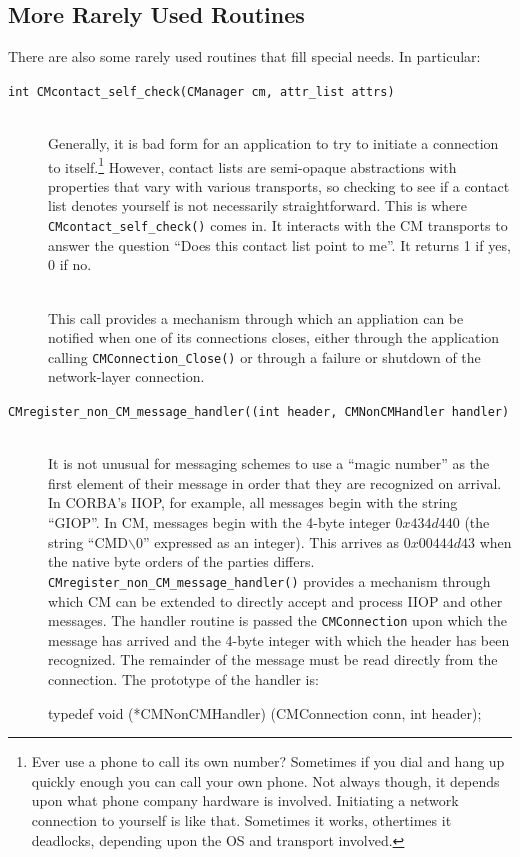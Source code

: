 \documentclass[11pt]{article}
\begin{document}
\subsection{More Rarely Used Routines}
There are also some rarely used routines that fill special needs.  In
particular: 
\begin{description}
\item[{\tt int CMcontact\_self\_check(CManager cm, attr\_list attrs)}] \ \\
Generally, it is bad form for an application to try to initiate a connection
to itself.\footnote{Ever use a phone to call its own number?  Sometimes if
you dial and hang up quickly enough you can call your own phone.  Not always
though, it depends upon what phone company hardware is involved.  Initiating
a network connection to yourself is like that.  Sometimes it works,
othertimes it deadlocks, depending upon the OS and transport involved.}
However, contact lists are semi-opaque abstractions with properties that
vary with various transports, so checking to see if a contact list denotes
yourself is not necessarily straightforward.   This is where {\tt
CMcontact\_self\_check()} comes in.  It interacts with the CM transports to
answer the question ``Does this contact list point to me''.  It returns 1 if
yes, 0 if no.
\item[\parbox{6.4in}{\tt void CMregister\_close\_handler(CMConnection conn,
CMCloseHandlerFunc func, \\ \hspace*{2.35in}void *client\_data))}]\ \\
This call provides a mechanism through which an
appliation can be notified when one of its connections closes, either
through the application calling {\tt CMConnection\_Close()} or through a
failure or shutdown of the network-layer connection.
\item[{\tt CMregister\_non\_CM\_message\_handler((int header, CMNonCMHandler
handler)}]\ \\
It is not unusual for messaging schemes to use a ``magic number'' as the
first element of their message in order that they are recognized on
arrival.  In CORBA's IIOP, for example, all messages begin with the string
``GIOP''.  In CM, messages begin with the 4-byte integer $0x434d440$
(the string ``CMD$\backslash$0'' expressed as an integer).  This arrives as
$0x00444d43$ when the native byte orders of the parties differs.  {\tt
CMregister\_non\_CM\_message\_handler()} provides a mechanism through which
CM can be extended to directly accept and process IIOP and other messages.
The handler routine is passed the {\tt CMConnection} upon which the message
has arrived and the 4-byte integer with which the header has been
recognized.  The remainder of the message must be read directly from the
connection.   The prototype of the handler is:
\begin{verbatimtab}
	typedef void (*CMNonCMHandler) (CMConnection conn,  int header);
\end{verbatimtab}
\end{description}
\end{document}
